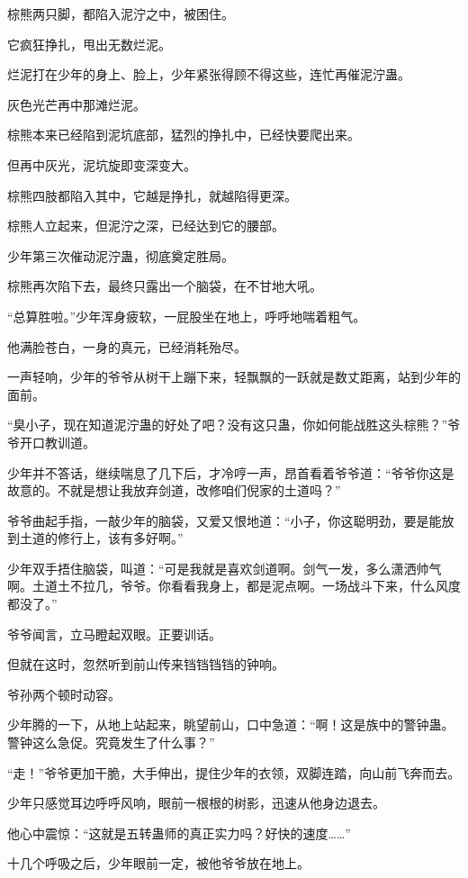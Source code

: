 \begin{this_body}
棕熊两只脚，都陷入泥泞之中，被困住。

它疯狂挣扎，甩出无数烂泥。

烂泥打在少年的身上、脸上，少年紧张得顾不得这些，连忙再催泥泞蛊。

灰色光芒再中那滩烂泥。

棕熊本来已经陷到泥坑底部，猛烈的挣扎中，已经快要爬出来。

但再中灰光，泥坑旋即变深变大。

棕熊四肢都陷入其中，它越是挣扎，就越陷得更深。

棕熊人立起来，但泥泞之深，已经达到它的腰部。

少年第三次催动泥泞蛊，彻底奠定胜局。

棕熊再次陷下去，最终只露出一个脑袋，在不甘地大吼。

“总算胜啦。”少年浑身疲软，一屁股坐在地上，呼呼地喘着粗气。

他满脸苍白，一身的真元，已经消耗殆尽。

一声轻响，少年的爷爷从树干上蹦下来，轻飘飘的一跃就是数丈距离，站到少年的面前。

“臭小子，现在知道泥泞蛊的好处了吧？没有这只蛊，你如何能战胜这头棕熊？”爷爷开口教训道。

少年并不答话，继续喘息了几下后，才冷哼一声，昂首看着爷爷道：“爷爷你这是故意的。不就是想让我放弃剑道，改修咱们倪家的土道吗？”

爷爷曲起手指，一敲少年的脑袋，又爱又恨地道：“小子，你这聪明劲，要是能放到土道的修行上，该有多好啊。”

少年双手捂住脑袋，叫道：“可是我就是喜欢剑道啊。剑气一发，多么潇洒帅气啊。土道土不拉几，爷爷。你看看我身上，都是泥点啊。一场战斗下来，什么风度都没了。”

爷爷闻言，立马瞪起双眼。正要训话。

但就在这时，忽然听到前山传来铛铛铛铛的钟响。

爷孙两个顿时动容。

少年腾的一下，从地上站起来，眺望前山，口中急道：“啊！这是族中的警钟蛊。警钟这么急促。究竟发生了什么事？”

“走！”爷爷更加干脆，大手伸出，提住少年的衣领，双脚连踏，向山前飞奔而去。

少年只感觉耳边呼呼风响，眼前一根根的树影，迅速从他身边退去。

他心中震惊：“这就是五转蛊师的真正实力吗？好快的速度……”

十几个呼吸之后，少年眼前一定，被他爷爷放在地上。


\end{this_body}
